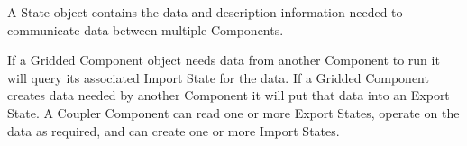 %


A State object contains the data and description information needed to
communicate data between multiple Components.

If a Gridded Component object needs data
from another Component to run it will query its associated
Import State for the data.  If a Gridded Component creates data
needed by another Component it will put that data into an
Export State.  A Coupler Component can read one or more Export States,
operate on the data as required, and can create one or more Import States.

 
